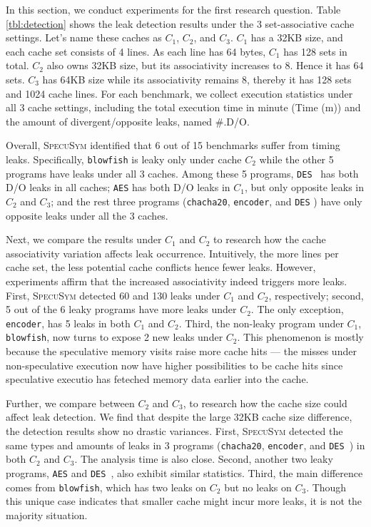 \documentclass[sigconf]{acmart}
\newcommand{\SpecuSym}{\textsc{SpecuSym} }
\begin{document}
In this section, we conduct experiments for the first research question. Table
\ref{tbl:detection} shows the leak detection results under the 3 set-associative 
cache settings. Let's name these caches as {$C_1$}, $C_2$, and $C_3$. $C_1$ has 
a 32KB size, and each cache set consists of 4 lines. As each line has 64 bytes, 
$C_1$ has 128 sets in total. $C_2$ also owns 32KB size, but its associativity 
increases to 8. Hence it has 64 sets. $C_3$ has 64KB size while its associativity 
remains 8, thereby it has 128 sets and 1024 cache lines. For each benchmark, we 
collect execution statistics under all 3 cache settings, including the total 
execution time in minute (Time (m)) and the amount of divergent/opposite leaks,
named \#.D/O. 


Overall, \SpecuSym identified that 6 out of 15 benchmarks suffer from timing 
leaks. Specifically, \texttt{blowfish} is leaky only under cache $C_2$ while 
the other 5 programs have leaks under all 3 caches. Among these 5 programs, 
\texttt{DES}~\cite{glibc} has both D/O leaks in all caches; \texttt{AES} has 
both D/O leaks in $C_1$, but only opposite leaks in $C_2$ and $C_3$; and the 
rest three programs (\texttt{chacha20}, \texttt{encoder}, and \texttt{DES}
\cite{OpenSSL111c}) have only opposite leaks under all the 3 caches.


Next, we compare the results under $C_1$ and $C_2$ to research how the cache 
associativity variation affects leak occurrence. Intuitively, the more lines 
per cache set, the less potential cache conflicts hence fewer leaks. However, 
experiments affirm that the increased associativity indeed triggers more leaks. 
First, \SpecuSym detected 60 and 130 leaks under $C_1$ and $C_2$, respectively; 
second, 5 out of the 6 leaky programs have more leaks under $C_2$. The only 
exception, \texttt{encoder}, has 5 leaks in both $C_1$ and $C_2$. Third, the 
non-leaky program under $C_1$, \texttt{blowfish}, now turns to expose 2 new 
leaks under $C_2$. This phenomenon is mostly because the speculative memory 
visits raise more cache hits --- the misses under non-speculative execution 
now have higher possibilities to be cache hits since speculative executio has
feteched memory data earlier into the cache. 


Further, we compare between $C_2$ and $C_3$, to research how the cache size 
could affect leak detection. We find that despite the large 32KB cache size 
difference, the detection results show no drastic variances. First, \SpecuSym
detected the same types and amounts of leaks in 3 programs (\texttt{chacha20}, 
\texttt{encoder}, and \texttt{DES}~\cite{OpenSSL111c}) in both $C_2$ and
$C_3$. The analysis time is also close. Second, another two leaky programs, 
\texttt{AES} and \texttt{DES}~\cite{glibc}, also exhibit similar statistics.
Third, the main difference comes from \texttt{blowfish}, which has two leaks 
on $C_2$ but no leaks on $C_3$. Though this unique case indicates that smaller 
cache might incur more leaks, it is not the majority situation. 
\end{document}
